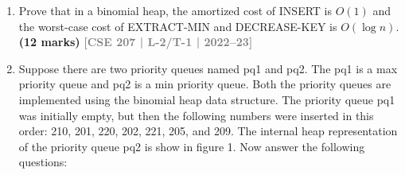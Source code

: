 \documentclass[12pt,a3paper]{article}
\newcommand{\yr}[1]{\hfill\textcolor{gray}{\small\textbf{[#1]}}}
\newcommand{\mk}[1]{\textcolor{orange!70!black}{\small\textbf{(#1 marks)}}}
\begin{document}
\begin{enumerate}
\item Prove that in a binomial heap, the amortized cost of INSERT is $O(1)$ and the worst-case cost of EXTRACT-MIN and DECREASE-KEY is $O(\log n)$.
\mk{12} \yr{CSE 207 | L-2/T-1 | 2022--23}


\item Suppose there are two priority queues named pq1 and pq2. The pq1 is a max priority queue and pq2 is a min priority queue. Both the priority queues are implemented using the binomial heap data structure. The priority queue pq1 was initially empty, but then the following numbers were inserted in this order: 210, 201, 220, 202, 221, 205, and 209. The internal heap representation of the priority queue pq2 is show in figure 1. Now answer the following questions:

\vspace{0.5cm}

\begin{center}
\end{center}
\end{enumerate}
\end{document}
